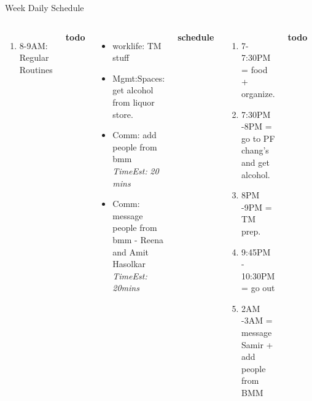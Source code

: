 \documentclass[serif, mathserif, final]{beamer}
\newcommand{\te}[1]{\textit{TimeEst:} \textit{#1}}
\begin{document}
\begin{frame}{}
\begin{columns}
\begin{column}{0.50\linewidth}
\begin{block}{Week Daily Schedule}
\begin{columns}
\begin{enumerate}
            \tiny \item \tiny 8-9AM: Regular Routines 
         
          \end{enumerate}
          
          \textbf{\small todo}\\
          \begin{itemize}
          \item \tiny worklife: TM stuff 
          \item \tiny Mgmt:Spaces: get alcohol from liquor store. 
            
          \item \tiny Comm: add people from bmm \te{20 mins} 
          \item \tiny Comm: message people from bmm - Reena and Amit
            Hasolkar  \te{20mins} 
          \end{itemize}
          \textbf{\small schedule}\\ 
          \begin{enumerate}
            \tiny \item \tiny 7-7:30PM = food + organize.  
            \tiny \item \tiny 7:30PM -8PM = go to PF chang's and get
            alcohol. 
            \tiny \item \tiny 8PM -9PM = TM prep. 
            \tiny \item \tiny 9:45PM - 10:30PM = go out 
            \tiny \item \tiny 2AM -3AM =  message Samir + add people
            from BMM
          \end{enumerate}
          
          \textbf{\small todo}\\
          \begin{itemize} 
          \item \tiny Work:comm: get ref letter from Maria Garzaran 
          \item \tiny Mgmt:Spaces: figure out return trip  
          \item \tiny Comm: add people from convention 
          \item \tiny Mgmt:webpresence: update fb pic 
            
          \end{itemize}
          \textbf{\small schedule}\\
          \begin{enumerate} 
            \tiny \item \tiny 
          \end{enumerate} 
        \end{columns}
      \end{block}
    \end{column}%
    

\end{columns}
\end{frame}
\end{document}

